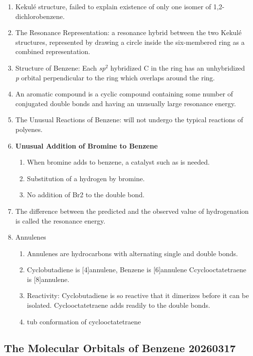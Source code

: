 \begin{enumerate}
    \item Kekulé structure, failed to explain existence of only one isomer of 1,2-dichlorobenzene.
    \item The Resonance Representation: a resonance hybrid between the two Kekulé structures, represented by drawing a circle inside the six-membered ring as a combined representation.
    \item Structure of Benzene: Each \textit{sp}$ ^2 $ hybridized C in the ring has an unhybridized \textit{p} orbital perpendicular to the ring which overlaps around the ring.
    \item An aromatic compound is a cyclic compound containing some number of conjugated double bonds and having an unusually large resonance energy.
    \item The Unusual Reactions of Benzene: will not undergo the typical reactions of polyenes.
    \item \textbf{Unusual Addition of Bromine to Benzene}
    \begin{enumerate}
        \item When bromine adds to benzene, a catalyst such as \textbf{} is needed.
        \item Substitution of a hydrogen by bromine.
        \item No addition of Br2 to the double bond.
    \end{enumerate}
    \item The difference between the predicted and the observed value  of hydrogenation is called the resonance energy.
    \item Annulenes
    \begin{enumerate}
        \item Annulenes are hydrocarbons with alternating single and double bonds.
        \item Cyclobutadiene is [4]annulene, Benzene is [6]annulene Ccyclooctatetraene is [8]annulene.
        \item Reactivity: Cyclobutadiene is so reactive that it dimerizes before it can be isolated. Cyclooctatetraene adds  readily to the double bonds.
        \item tub conformation of cyclooctatetraene
    \end{enumerate}
\end{enumerate}

\subsection{The Molecular Orbitals of Benzene 20260317}

